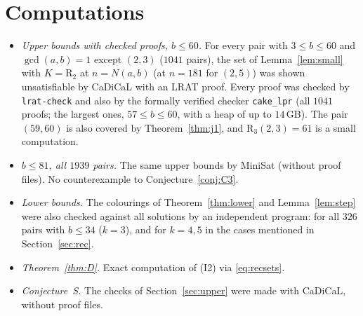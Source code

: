 \documentclass[11pt,a4paper]{article}
\theoremstyle{definition}
\theoremstyle{remark}
\newcommand{\R}{\mathrm{R}}
\begin{document}
\section{Computations}\label{sec:comp}
\begin{itemize}
\item \emph{Upper bounds with checked proofs, $b\le60$.} For every pair with $3\le b\le60$ and $\gcd(a,b)=1$ except $(2,3)$ ($1041$ pairs), the set of Lemma~\ref{lem:small} with $K=\R_2$ at $n=N(a,b)$ (at $n=181$ for $(2,5)$) was shown unsatisfiable by CaDiCaL with an LRAT proof. Every proof was checked by \texttt{lrat-check} and also by the formally verified checker \texttt{cake\_lpr} \cite{THM21} (all $1041$ proofs; the largest ones, $57\le b\le60$, with a heap of up to $14$\,GB). The pair $(59,60)$ is also covered by Theorem~\ref{thm:j1}, and $\R_3(2,3)=61$ is a small computation.
\item \emph{$b\le81$, all $1939$ pairs.} The same upper bounds by MiniSat (without proof files). No counterexample to Conjecture~\ref{conj:C3}.
\item \emph{Lower bounds.} The colourings of Theorem~\ref{thm:lower} and Lemma~\ref{lem:step} were also checked against all solutions by an independent program: for all $326$ pairs with $b\le34$ ($k=3$), and for $k=4,5$ in the cases mentioned in Section~\ref{sec:rec}.
\item \emph{Theorem~\ref{thm:D}.} Exact computation of (I2) via \eqref{eq:recsets}.
\item \emph{Conjecture~S.} The checks of Section~\ref{sec:upper} were made with CaDiCaL, without proof files.
\end{itemize}
\end{document}
